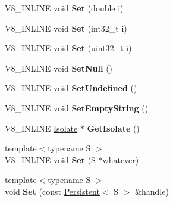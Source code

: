 \begin{DoxyCompactItemize}
\item 
\hypertarget{classv8_1_1ReturnValue_a28bc181b8f64fd21a331bf42d97fe41f}{}V8\+\_\+\+I\+N\+L\+I\+N\+E void {\bfseries Set} (double i)\label{classv8_1_1ReturnValue_a28bc181b8f64fd21a331bf42d97fe41f}

\item 
\hypertarget{classv8_1_1ReturnValue_ab214555052e3d03b8c44a7e8779bcbc2}{}V8\+\_\+\+I\+N\+L\+I\+N\+E void {\bfseries Set} (int32\+\_\+t i)\label{classv8_1_1ReturnValue_ab214555052e3d03b8c44a7e8779bcbc2}

\item 
\hypertarget{classv8_1_1ReturnValue_a9e190fff3c0396656e752ee916c715dc}{}V8\+\_\+\+I\+N\+L\+I\+N\+E void {\bfseries Set} (uint32\+\_\+t i)\label{classv8_1_1ReturnValue_a9e190fff3c0396656e752ee916c715dc}

\item 
\hypertarget{classv8_1_1ReturnValue_aba8480ee94ea905ad0850b3ceaf1b9b1}{}V8\+\_\+\+I\+N\+L\+I\+N\+E void {\bfseries Set\+Null} ()\label{classv8_1_1ReturnValue_aba8480ee94ea905ad0850b3ceaf1b9b1}

\item 
\hypertarget{classv8_1_1ReturnValue_af73d4ed15f126a214efe583ac56ff19d}{}V8\+\_\+\+I\+N\+L\+I\+N\+E void {\bfseries Set\+Undefined} ()\label{classv8_1_1ReturnValue_af73d4ed15f126a214efe583ac56ff19d}

\item 
\hypertarget{classv8_1_1ReturnValue_a3ed4f59f726eafae53525bb68512b93e}{}V8\+\_\+\+I\+N\+L\+I\+N\+E void {\bfseries Set\+Empty\+String} ()\label{classv8_1_1ReturnValue_a3ed4f59f726eafae53525bb68512b93e}

\item 
\hypertarget{classv8_1_1ReturnValue_a8744931ca4536bcc2f95e344072a3f03}{}V8\+\_\+\+I\+N\+L\+I\+N\+E \hyperlink{classv8_1_1Isolate}{Isolate} $\ast$ {\bfseries Get\+Isolate} ()\label{classv8_1_1ReturnValue_a8744931ca4536bcc2f95e344072a3f03}

\item 
\hypertarget{classv8_1_1ReturnValue_acbfa5f2c7cf2e95b42a4dcf79874fbe5}{}{\footnotesize template$<$typename S $>$ }\\V8\+\_\+\+I\+N\+L\+I\+N\+E void {\bfseries Set} (S $\ast$whatever)\label{classv8_1_1ReturnValue_acbfa5f2c7cf2e95b42a4dcf79874fbe5}

\item 
\hypertarget{classv8_1_1ReturnValue_a2ff02f4be7d7fdcf0e21be43dfd4fe43}{}{\footnotesize template$<$typename S $>$ }\\void {\bfseries Set} (const \hyperlink{classv8_1_1Persistent}{Persistent}$<$ S $>$ \&handle)\label{classv8_1_1ReturnValue_a2ff02f4be7d7fdcf0e21be43dfd4fe43}


\end{DoxyCompactItemize}
